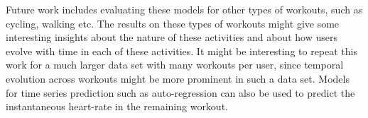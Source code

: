 \documentclass{acm_proc_article-sp}
\begin{document}
Future work includes evaluating these models for other types of workouts, such as cycling, walking etc. The results on these types of workouts might give some interesting insights about the nature of these activities and about how users evolve with time in each of these activities. It might be interesting to repeat this work for a much larger data set with many workouts per user, since temporal evolution across workouts might be more prominent in such a data set. Models for time series prediction such as auto-regression \cite{autoRegressiveModelWiki} can also be used to predict the instantaneous heart-rate in the remaining workout.




\end{document}
